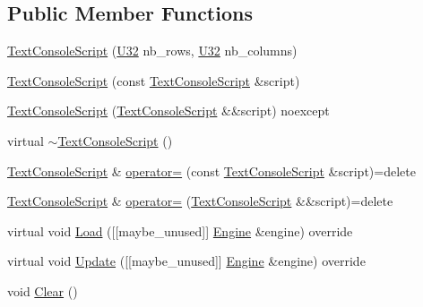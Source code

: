 \subsection*{Public Member Functions}
\begin{DoxyCompactItemize}
\item 
\hyperlink{classmage_1_1script_1_1_text_console_script_a5b26c235c08fb2e443ce3f728985a41e}{Text\+Console\+Script} (\hyperlink{namespacemage_a41c104c036fba3756a74e19f793eeaa1}{U32} nb\+\_\+rows, \hyperlink{namespacemage_a41c104c036fba3756a74e19f793eeaa1}{U32} nb\+\_\+columns)
\item 
\hyperlink{classmage_1_1script_1_1_text_console_script_a82c8a2c15aa51befbfe6341e463057db}{Text\+Console\+Script} (const \hyperlink{classmage_1_1script_1_1_text_console_script}{Text\+Console\+Script} \&script)
\item 
\hyperlink{classmage_1_1script_1_1_text_console_script_a46052af67069fef12a8ff9de75cce382}{Text\+Console\+Script} (\hyperlink{classmage_1_1script_1_1_text_console_script}{Text\+Console\+Script} \&\&script) noexcept
\item 
virtual \hyperlink{classmage_1_1script_1_1_text_console_script_af0959c8a4f21bb4f9b5553dffc5710b9}{$\sim$\+Text\+Console\+Script} ()
\item 
\hyperlink{classmage_1_1script_1_1_text_console_script}{Text\+Console\+Script} \& \hyperlink{classmage_1_1script_1_1_text_console_script_a68af2a144f641c9813b333544fe3562a}{operator=} (const \hyperlink{classmage_1_1script_1_1_text_console_script}{Text\+Console\+Script} \&script)=delete
\item 
\hyperlink{classmage_1_1script_1_1_text_console_script}{Text\+Console\+Script} \& \hyperlink{classmage_1_1script_1_1_text_console_script_ae8560dece8d507ee338dda68e3176fed}{operator=} (\hyperlink{classmage_1_1script_1_1_text_console_script}{Text\+Console\+Script} \&\&script)=delete
\item 
virtual void \hyperlink{classmage_1_1script_1_1_text_console_script_a1e5a7bdff2d47b835932d7220a4e2571}{Load} (\mbox{[}\mbox{[}maybe\+\_\+unused\mbox{]}\mbox{]} \hyperlink{classmage_1_1_engine}{Engine} \&engine) override
\item 
virtual void \hyperlink{classmage_1_1script_1_1_text_console_script_ad619f93a946660b30f5e39821778f7b0}{Update} (\mbox{[}\mbox{[}maybe\+\_\+unused\mbox{]}\mbox{]} \hyperlink{classmage_1_1_engine}{Engine} \&engine) override
\item 
void \hyperlink{classmage_1_1script_1_1_text_console_script_a274764deea9f02ec77515680456548d6}{Clear} ()

\end{DoxyCompactItemize}
